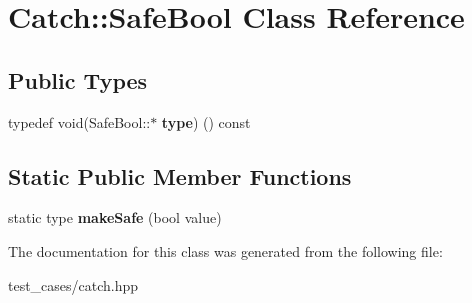 \hypertarget{classCatch_1_1SafeBool}{}\section{Catch\+:\+:Safe\+Bool Class Reference}
\label{classCatch_1_1SafeBool}
\subsection*{Public Types}
\begin{DoxyCompactItemize}
\item 
\mbox{\label{classCatch_1_1SafeBool_a39eef9baed296299d625a54d54a2a958}} 
typedef void(Safe\+Bool\+::$\ast$ {\bfseries type}) () const
\end{DoxyCompactItemize}
\subsection*{Static Public Member Functions}
\begin{DoxyCompactItemize}
\item 
\mbox{\label{classCatch_1_1SafeBool_af0ea63d9820f8bf7a8b76377913c4e77}} 
static type {\bfseries make\+Safe} (bool value)
\end{DoxyCompactItemize}


The documentation for this class was generated from the following file\+:\begin{DoxyCompactItemize}
\item 
test\+\_\+cases/catch.\+hpp\end{DoxyCompactItemize}
